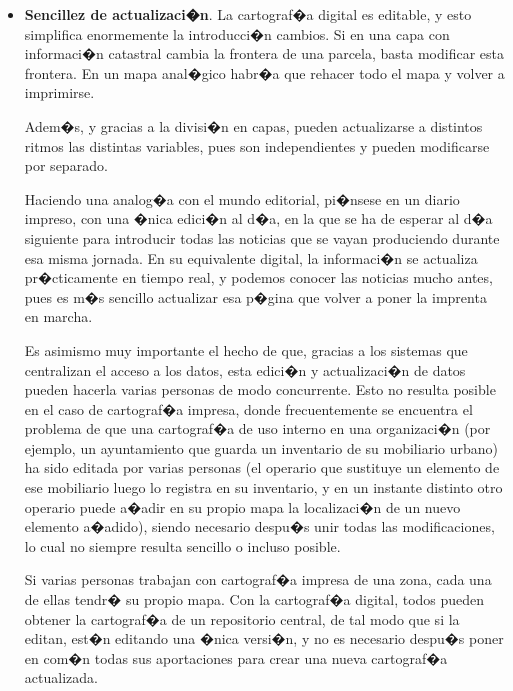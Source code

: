 \begin{itemize}
 \item \textbf{Sencillez de actualizaci�n}. La cartograf�a digital es editable, y esto simplifica enormemente la introducci�n cambios. Si en una capa con informaci�n catastral cambia la frontera de una parcela, basta modificar esta frontera. En un mapa anal�gico habr�a que rehacer todo el mapa y volver a imprimirse. 

Adem�s, y gracias a la divisi�n en capas, pueden actualizarse a distintos ritmos las distintas variables, pues son independientes y pueden modificarse por separado.

Haciendo una analog�a con el mundo editorial, pi�nsese en un diario impreso, con una �nica edici�n al d�a, en la que se ha de esperar al d�a siguiente para introducir todas las noticias que se vayan produciendo durante esa misma jornada. En su equivalente digital, la informaci�n se actualiza pr�cticamente en tiempo real, y podemos conocer las noticias mucho antes, pues es m�s sencillo actualizar esa p�gina que volver a poner la imprenta en marcha.

Es asimismo muy importante el hecho de que, gracias a los sistemas que centralizan el acceso a los datos, esta edici�n y actualizaci�n de datos pueden hacerla varias personas de modo concurrente. Esto no resulta posible en el caso de cartograf�a impresa, donde frecuentemente se encuentra el problema de que una cartograf�a de uso interno en una organizaci�n (por ejemplo, un ayuntamiento que guarda un inventario de su mobiliario urbano) ha sido editada por varias personas (el operario que sustituye un elemento de ese mobiliario luego lo registra en su inventario, y en un instante distinto otro operario puede a�adir en su propio mapa la localizaci�n de un nuevo elemento a�adido), siendo necesario despu�s unir todas las modificaciones, lo cual no siempre resulta sencillo o incluso posible. 

Si varias personas trabajan con cartograf�a impresa de una zona, cada una de ellas tendr� su propio mapa. Con la cartograf�a digital, todos pueden obtener la cartograf�a de un repositorio central, de tal modo que si la editan, est�n editando una �nica versi�n, y no es necesario despu�s poner en com�n todas sus aportaciones para crear una nueva cartograf�a actualizada.


\end{itemize}
